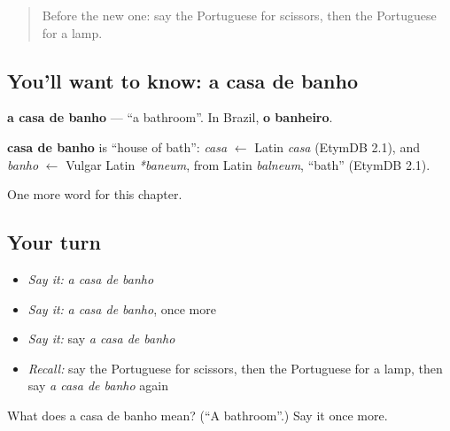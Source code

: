 \begin{quote}
Before the new one: say the Portuguese for scissors, then the Portuguese for a lamp.
\end{quote}

\subsection*{You'll want to know: a casa de banho}
\textbf{a casa de banho} — \textquotedblleft{}a bathroom\textquotedblright{}. In Brazil, \textbf{o banheiro}.

\begin{cousinweb}
\textbf{casa de banho} is \textquotedblleft{}house of bath\textquotedblright{}: \emph{casa} $\leftarrow$ Latin \emph{casa} (EtymDB 2.1), and \emph{banho} $\leftarrow$ Vulgar Latin \emph{*baneum}, from Latin \emph{balneum}, \textquotedblleft{}bath\textquotedblright{} (EtymDB 2.1).
\end{cousinweb}

\begin{grammarlens}[title={What you've built}]
One more word for this chapter.
\end{grammarlens}

\subsection*{Your turn}
\begin{itemize}
\raggedright
  \item \emph{Say it:} \emph{a casa de banho}
  \item \emph{Say it:} \emph{a casa de banho}, once more
  \item \emph{Say it:} say \emph{a casa de banho}
  \item \emph{Recall:} say the Portuguese for scissors, then the Portuguese for a lamp, then say \emph{a casa de banho} again
\end{itemize}

\begin{tcolorbox}[breakable,colback=teal!4,colframe=teal!35!black,title={Before you move on}]
What does a casa de banho mean? (\textquotedblleft{}A bathroom\textquotedblright{}.) Say it once more.
\end{tcolorbox}

